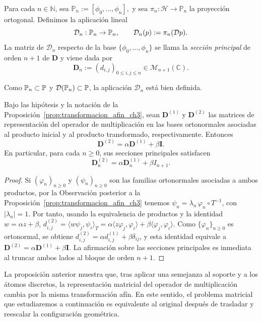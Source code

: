 \begin{defn}\label{def:seccion_truncada}
	Para cada $n\in\mathbb N$, sea
	\(
	\mathbb P_n:=[\phi_0,\dots,\phi_n],
	\)
	y sea $\pi_n:\mathcal H\to\mathbb P_n$ la proyección ortogonal. Definimos la aplicación lineal
	\[
		\mathcal D_n:\mathbb P_n\to\mathbb P_n,
		\qquad
		\mathcal D_n(p):=\pi_n(\mathcal{D} p).
	\]
	La matriz de $\mathcal D_n$ respecto de la base $\{\phi_0,\dots,\phi_n\}$ se llama la \emph{sección principal} de orden $n+1$ de $\mathbf D$ y viene dada por
	\[
		\mathbf D_n:=(d_{i,j})_{0\le i,j\le n}\in\mathcal M_{n+1}(\mathbb C).
	\]
\end{defn}

\begin{rmk}
	Como $\mathbb P_n\subset\mathbb{P}$ y $\mathcal{D}(\mathbb P_n)\subset\mathbb{P}$, la aplicación $\mathcal D_n$ está bien definida.
\end{rmk}

\begin{prop}\label{prop:transformacion_afin_matriz}
	Bajo las hipótesis y la notación de la Proposición~\ref{prop:transformacion_afin_ch3}, sean $\mathbf D^{(1)}$ y $\mathbf D^{(2)}$ las matrices de representación del operador de multiplicación en las bases ortonormales asociadas al producto inicial y al producto transformado, respectivamente. Entonces
	\[
		\mathbf D^{(2)}=\alpha\mathbf D^{(1)}+\beta\mathbf I.
	\]
	En particular, para cada $n\ge 0$, sus secciones principales satisfacen
	\[
		\mathbf D^{(2)}_n=\alpha\mathbf D^{(1)}_n+\beta I_{n+1}.
	\]
\end{prop}

\begin{proof}
	Si $(\varphi_n)_{n\ge0}$ y $(\psi_n)_{n\ge0}$ son las familias ortonormales asociadas a ambos productos, por la Observación posterior a la Proposición~\ref{prop:transformacion_afin_ch3} tenemos
	\(\psi_n=\lambda_n\,\varphi_n\circ T^{-1}\), con \(|\lambda_n|=1\).
	Por tanto, usando la equivalencia de productos y la identidad $w=\alpha z+\beta$, \(d^{(2)}_{i,j}=\langle w\psi_j,\psi_i\rangle_T=\alpha\langle z\varphi_j,\varphi_i\rangle+\beta\langle\varphi_j,\varphi_i\rangle\).
	Como $\{\varphi_n\}_{n\ge0}$ es ortonormal, se obtiene \(d^{(2)}_{i,j}=\alpha d^{(1)}_{i,j}+\beta\delta_{ij}\),
	y esta identidad equivale a $\mathbf D^{(2)}=\alpha\mathbf D^{(1)}+\beta\mathbf I$. La afirmación sobre las secciones principales es inmediata al truncar ambos lados al bloque de orden $n+1$.
\end{proof}

\begin{rmk}
	La proposición anterior muestra que, tras aplicar una semejanza al soporte y a los átomos discretos, la representación matricial del operador de multiplicación cambia por la misma transformación afín. En este sentido, el problema matricial que estudiaremos a continuación es equivalente al original después de trasladar y reescalar la configuración geométrica.
\end{rmk}

